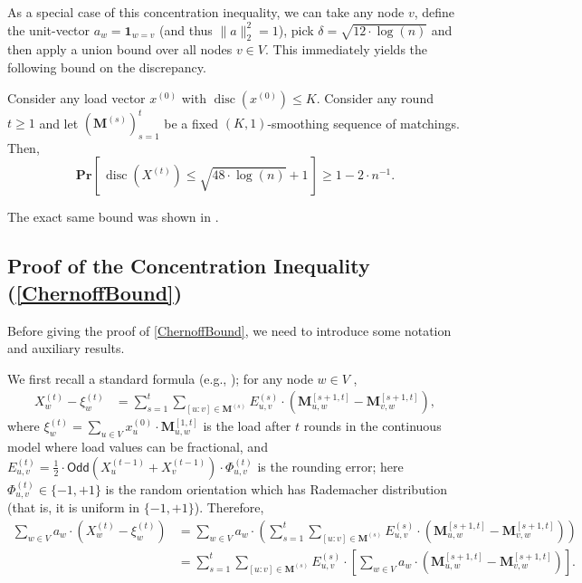 \documentclass[twoside,leqno]{article}
\newcommand{\Odd}{\mathsf{Odd}}
\newcommand{\Pro}[1]{\mathbf{Pr} \left[\,#1\,\right]}
\newcommand{\M}{\mathbf{M}}
\DeclareMathOperator{\discr}{\mathrm{disc}}
\DeclareMathOperator{\1}{\mathbf{1}}
\numberwithin{equation}{section}
\begin{document}
As a special case of this concentration inequality, we can take any node $v$, define the unit-vector $a_w=\mathbf{1}_{w=v}$ (and thus $\|a\|_2^2=1$), pick $\delta= \sqrt{12 \cdot \log (n)}$ and then apply a union bound over all nodes $v \in V$. This immediately yields the following bound on the discrepancy.
\begin{corollary}\label{cor:disc32}
Consider any load vector $x^{(0)}$ with $\discr(x^{(0)}) \leq K$.
Consider any round $t\ge 1$ and let $(\M^{(s)})_{s=1}^{t}$ be a fixed $(K,1)$-smoothing sequence of matchings. Then,
\[
 \Pro{ 
 \discr(X^{(t)}) \leq  \sqrt{48\cdot \log(n)} + 1} \geq 1 - 2\cdot n^{-1}.
\]
\end{corollary}
The exact same bound was shown in \cite[Theorem~3.6]{DBLP:conf/focs/SauerwaldS12}. 
\subsection{Proof of the Concentration Inequality (\cref{ChernoffBound})}

Before giving the proof of \cref{ChernoffBound}, we need to introduce some notation and auxiliary results.

We first recall a standard formula (e.g., \cite[Equation~2.5]{DBLP:conf/focs/SauerwaldS12}); for any node $w \in V$ ,
\begin{align}
X_w^{(t)} - \xi_{w}^{(t)}
&= \sum_{s=1}^{t} \sum_{[u:v] \in \M^{(s)}} E_{u,v}^{(s)} \cdot \left( \M_{u,w}^{[s+1,t]} - \M_{v,w}^{[s+1,t]} \right), \label{eq:disc_cont}
\end{align}
where $\xi_w^{(t)} = \sum_{u \in V} x_u^{(0)} \cdot \M_{u,w}^{[1,t]} $ is the load after $t$ rounds in the continuous model where load values can be fractional, and $E_{u,v}^{(t)} = \frac{1}{2}\cdot \Odd\left(X_u^{(t-1)}+X_v^{(t-1)}\right)\cdot \Phi_{u,v}^{(t)}$ is the rounding error; here $\Phi_{u,v}^{(t)} \in \{-1,+1\}$ is the random orientation which has Rademacher distribution (that is, it is uniform in $\{-1,+1\}$).
Therefore,
\begin{align*}
\sum_{w\in V} a_w \cdot \left( X_w^{(t)} - \xi_w^{(t)} \right) &= \sum_{w \in V} a_w \cdot \left( \sum_{s=1}^{t} \sum_{[u:v] \in \M^{(s)}} E_{u,v}^{(s)} \cdot \left( \M_{u,w}^{[s+1,t]} - \M_{v,w}^{[s+1,t]} \right) \right) \\
&= \sum_{s=1}^{t} \sum_{[u:v] \in \M^{(s)}} E_{u,v}^{(s)} \cdot \left[ \sum_{w \in V} a_w \cdot \left( \M_{u,w}^{[s+1,t]} -\M_{v,w}^{[s+1,t]} \right) \right].
\end{align*}
\end{document}
